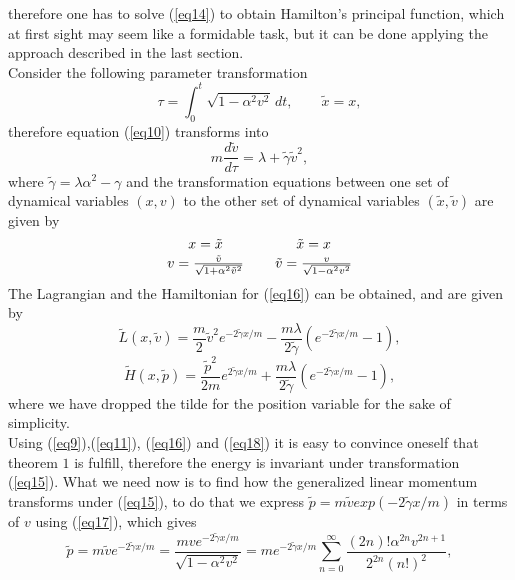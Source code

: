 therefore one has to solve (\ref{eq14}) to obtain Hamilton's
principal function, which at first sight may seem like a
formidable task, but it can be done applying the approach
described in the last section.\\
Consider the following parameter transformation
\begin{equation}
\tau=\int_{0}^{t} \sqrt{1-\alpha^{2}v^{2}}\,dt, \qquad
\tilde{x}=x, \label{eq15}
\end{equation}
therefore equation (\ref{eq10}) transforms into
\begin{equation}
m\frac{d\tilde{v}}{d\tau}=\lambda+\tilde{\gamma}\tilde{v}^2,
\label{eq16}
\end{equation}
where $\tilde{\gamma}=\lambda\alpha^2-\gamma$ and the
transformation equations between one set of dynamical variables
$(x,v)$ to the other set of dynamical variables
$(\tilde{x},\tilde{v})$ are given by
\begin{eqnarray}
{x=\tilde{x} \atop
v=\frac{\tilde{v}}{\sqrt{1+\alpha^2\tilde{v}^{2}}}} \qquad
{\tilde{x}=x \atop \tilde{v}=\frac{v}{\sqrt{1-\alpha^2v^{2}}}}
\label{eq17}
\end{eqnarray}
The Lagrangian and the Hamiltonian for (\ref{eq16}) can be
obtained, and are given by \cite{GL2}
\begin{equation}
\tilde{L}(x,\tilde{v})=\frac{m}{2}\tilde{v}^2
e^{-2\tilde{\gamma}x/m}-\frac{m\lambda}{2\tilde{\gamma}}\left(
e^{-2\tilde{\gamma}x/m} - 1\right), \label{eq18}
\end{equation}
\begin{equation}
\tilde{H}(x,\tilde{p})=\frac{\tilde{p}^2}{2m}e^{2\tilde{\gamma}x/m}+
\frac{m\lambda}{2\tilde{\gamma}}\left(e^{-2\tilde{\gamma}x/m} -
1\right),  \label{eq19}
\end{equation}
where we have dropped the tilde for the position variable for the
sake of simplicity. \\
Using (\ref{eq9}),(\ref{eq11}), (\ref{eq16}) and (\ref{eq18}) it
is easy to convince oneself that theorem $1$ is fulfill, therefore
the energy is invariant under transformation (\ref{eq15}). What we
need now is to find how the generalized linear momentum transforms
under (\ref{eq15}), to do that we express
$\tilde{p}=m\tilde{v}exp(-2\tilde{\gamma}x/m)$ in terms of $v$
using (\ref{eq17}), which gives
\begin{equation}
\tilde{p}=m\tilde{v}e^{-2\tilde{\gamma}x/m}=\frac{mve^{-2\tilde{\gamma}x/m}}
{\sqrt{1-\alpha^2v^{2}}}=me^{-2\tilde{\gamma}x/m}\sum_{n=0}^\infty
\frac{(2n)!\alpha^{2n}v^{2n+1}}{2^{2n}(n!)^2}, \label{eq20}
\end{equation}
